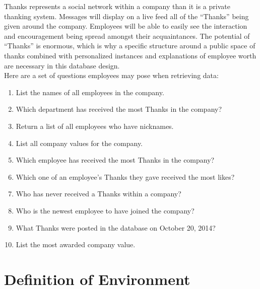 \documentclass[11pt]{report}
\begin{document}
\indent Thanks represents a social network within a company than it is a private thanking system. Messages will display on a live feed all of the “Thanks” being given around the company. Employees will be able to easily see the interaction and encouragement being spread amongst their acquaintances. The potential of “Thanks” is enormous, which is why a specific structure around a public space of thanks combined with personalized instances and explanations of employee worth are necessary in this database design.\\

\clearpage
Here are a set of questions employees may pose when retrieving data:
\begin{enumerate}
    \item List the names of all employees in the company.
    \item Which department has received the most Thanks in the company?
    \item Return a list of all employees who have nicknames.
    \item List all company values for the company.
    \item Which employee has received the most Thanks in the company?
    \item Which one of an employee's Thanks they gave received the most likes?
    \item Who has never received a Thanks within a company?
    \item Who is the newest employee to have joined the company?
    \item What Thanks were posted in the database on October 20, 2014?
    \item List the most awarded company value.
\end{enumerate}

\chapter{Definition of Environment}
\end{document}
